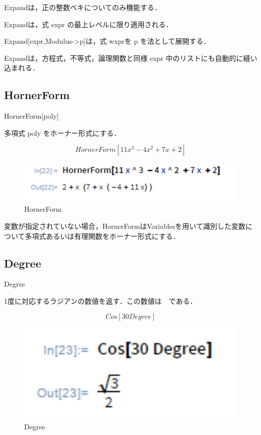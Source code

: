 Expandは，正の整数ベキについてのみ機能する．

Expandは，式 expr の最上レベルに限り適用される．

Expand[expr,Modulus->p]は，式 wxprを p を法として展開する． 

Expandは，方程式，不等式，論理関数と同様 expr 中のリストにも自動的に縫い込まれる．


\subsection {HornerForm}

HornerForm[poly]

多項式 poly をホーナー形式にする．

\[HornerForm[11 x^3 - 4 x^2 + 7 x + 2]\]

\begin{figure}[h]
\centering
\includegraphics[width=15cm]{hornerform.png}
\caption{HornerForm}\label{図}
\end{figure}

変数が指定されていない場合，HornerFormはVariablesを用いて識別した変数について多項式あるいは有理関数をホーナー形式にする．


\subsection {Degree}

Degree

1度に対応するラジアンの数値を返す．この数値は　である．

\[Cos[30 Degree]\]

\begin{figure}[h]
\centering
\includegraphics[width=15cm]{degree.png}
\caption{Degree}\label{図}
\end{figure}

